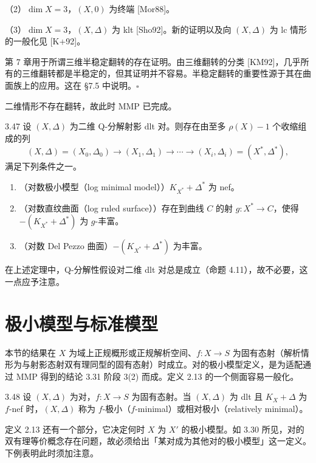 \par\noindent（2）$\dim X=3$，$(X,0)$ 为终端 [Mor88]。

\par\noindent（3）$\dim X=3$，$(X,\Delta)$ 为 klt [Sho92]。新的证明以及向 $(X,\Delta)$ 为 lc 情形的一般化见 [K+92]。

第 7 章用于所谓三维半稳定翻转的存在证明。由三维翻转的分类 [KM92]，几乎所有的三维翻转都是半稳定的，但其证明并不容易。半稳定翻转的重要性源于其在曲面族上的应用。这在 §7.5 中说明。\hfill$\square$

二维情形不存在翻转，故此时 MMP 已完成。

\begin{theorem}{3.47}
设 $(X,\Delta)$ 为二维 Q-分解射影 dlt 对。则存在由至多 $\rho(X)-1$ 个收缩组成的列
\[
(X,\Delta)=(X_0,\Delta_0)\to(X_1,\Delta_1)\to\cdots\to(X_i,\Delta_i)=(X^{*},\Delta^{*}),
\]
满足下列条件之一。
\begin{enumerate}[label=(\arabic*)]
\item （对数极小模型（log minimal model））$K_{X^{*}}+\Delta^{*}$ 为 nef。
\item （对数直纹曲面（log ruled surface））存在到曲线 $C$ 的射 $g:X^{*}\to C$，使得 $-(K_{X^{*}}+\Delta^{*})$ 为 $g$-丰富。
\item （对数 Del Pezzo 曲面）$-(K_{X^{*}}+\Delta^{*})$ 为丰富。
\end{enumerate}
\end{theorem}

在上述定理中，Q-分解性假设对二维 dlt 对总是成立（命题 4.11），故不必要，这一点应予注意。

\section{极小模型与标准模型}

本节的结果在 $X$ 为域上正规概形或正规解析空间、$f:X\to S$ 为固有态射（解析情形为与射影态射双有理同型的固有态射）时成立。对的极小模型定义，是为适配通过 MMP 得到的结论 3.31 阶段 3(2) 而成。定义 2.13 的一个侧面容易一般化。

\begin{definition}{3.48}
设 $(X,\Delta)$ 为对，$f:X\to S$ 为固有态射。当 $(X,\Delta)$ 为 dlt 且 $K_X+\Delta$ 为 $f$-nef 时，$(X,\Delta)$ 称为 $f$-极小（$f$-minimal）或相对极小（relatively minimal）。
\end{definition}
定义 2.13 还有一个部分，它决定何时 $X$ 为 $X'$ 的极小模型。如 3.30 所见，对的双有理等价概念存在问题，故必须给出「某对成为其他对的极小模型」这一定义。下例表明此时须加注意。

